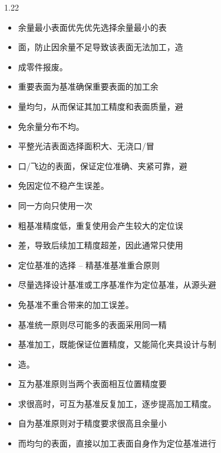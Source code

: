 \documentclass[12pt,a4paper]{article}
\begin{document}
\begin{spacing}{1.22}
\begin{itemize}[leftmargin=2.2em,label=--]
  \item 余量最小表面优先优先选择余量最小的表
  \item 面，防止因余量不足导致该表面无法加工，造
  \item 成零件报废。
  \item 重要表面为基准确保重要表面的加工余
  \item 量均匀，从而保证其加工精度和表面质量，避
  \item 免余量分布不均。
  \item 平整光洁表面选择面积大、无浇口/冒
  \item 口/飞边的表面，保证定位准确、夹紧可靠，避
  \item 免因定位不稳产生误差。
  \item 同一方向只使用一次
  \item 粗基准精度低，重复使用会产生较大的定位误
  \item 差，导致后续加工精度超差，因此通常只使用
  \item 定位基准的选择 – 精基准基准重合原则
  \item 尽量选择设计基准或工序基准作为定位基准，从源头避
  \item 免基准不重合带来的加工误差。
  \item 基准统一原则尽可能多的表面采用同一精
  \item 基准加工，既能保证位置精度，又能简化夹具设计与制
  \item 造。
  \item 互为基准原则当两个表面相互位置精度要
  \item 求很高时，可互为基准反复加工，逐步提高加工精度。
  \item 自为基准原则对于精度要求很高且余量小
  \item 而均匀的表面，直接以加工表面自身作为定位基准进行
\end{itemize}


\end{spacing}
\end{document}
